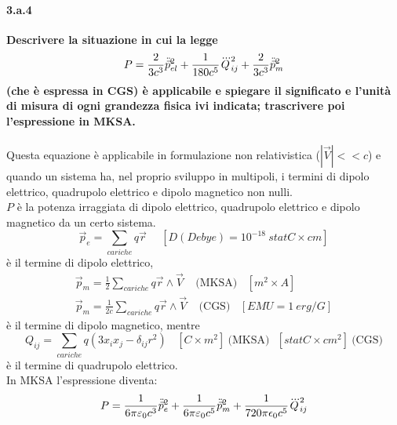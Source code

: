 \documentclass[twoside]{article}
\begin{document}
\paragraph{3.a.4}\textbf{Descrivere la situazione in cui la legge
\begin{equation*}
    P=\frac{2}{3c^3}\Ddot{\vec{p}}_{el}^2 +\frac{1}{180 c^5}\dddot{Q}_{ij}^2+\frac{2}{3c^3}\Ddot{\vec{p}}_m^2
\end{equation*}
(che è espressa in
CGS) è applicabile e spiegare il significato e l'unità di misura di ogni grandezza
fisica ivi indicata; trascrivere poi l'espressione in MKSA.}\\ \\
Questa equazione è applicabile in formulazione non relativistica ($|\vec{V}|<<c$) e quando un sistema ha, nel proprio sviluppo in multipoli, i termini di dipolo elettrico, quadrupolo elettrico e dipolo magnetico non nulli.\\

$P$ è la potenza irraggiata di dipolo elettrico, quadrupolo elettrico e dipolo magnetico da un certo sistema. \\
\begin{equation}
\vec{p}_e=\sum_{cariche} q\vec{r} \ \ \ \ \ \ [D(Debye)=10^{-18} \ statC\times cm]
\end{equation} 
è il termine di dipolo elettrico,
\begin{equation}\begin{split}
\vec{p}_m=\frac{1}{2}\sum_{cariche}q\vec{r}\wedge \vec{V} \ \ \ \ \  \text{(MKSA)} \ \ \ \ [m^2\times A] \\ \vec{p}_m=\frac{1}{2c}\sum_{cariche}q\vec{r}\wedge \vec{V} \ \ \ \ \  \text{(CGS)} \ \ \ \ [EMU=1 \ erg/G]
\end{split}\end{equation}
è il termine di dipolo magnetico, mentre 
\begin{equation}
Q_{ij}=\sum_{cariche}q(3x_ix_j-\delta_{ij}r^2) \ \ \ \ [C\times m^2] \ \text{(MKSA)} \ \ \ [statC\times cm^2] \ \text{(CGS)}
\end{equation}
è il termine di quadrupolo elettrico.
\\
In MKSA l'espressione diventa:
\begin{equation}
    P=\frac{1}{6\pi \varepsilon_0 c^3}\Ddot{\vec{p}}^2_e + \frac{1}{6\pi \varepsilon_0 c^5}\Ddot{\vec{p}}^2_m+\frac{1}{720 \pi \epsilon_0 c^5}\dddot{Q}_{ij}^2
\end{equation}
\end{document}
